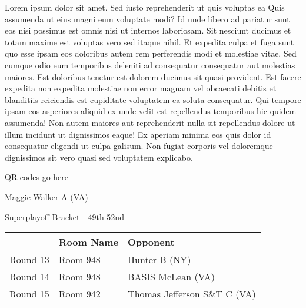 \documentclass{article}%
\begin{document}
\vspace*{8pt}%
\linebreak%
\newline%
\newline%
Lorem ipsum dolor sit amet. Sed iusto reprehenderit ut quis voluptas ea Quis assumenda ut eius magni eum voluptate modi? Id unde libero ad pariatur sunt eos nisi possimus est omnis nisi ut internos laboriosam. Sit nesciunt ducimus et totam maxime est voluptas vero sed itaque nihil. Et expedita culpa et fuga sunt quo esse ipsam eos doloribus autem rem perferendis modi et molestiae vitae.\newline%
\newline%
Sed cumque odio eum temporibus deleniti ad consequatur consequatur aut molestias maiores. Est doloribus tenetur est dolorem ducimus sit quasi provident. Est facere expedita non expedita molestiae non error magnam vel obcaecati debitis et blanditiis reiciendis est cupiditate voluptatem ea soluta consequatur. Qui tempore ipsam eos asperiores aliquid ex unde velit est repellendus temporibus hic quidem assumenda!\newline%
\newline%
Non autem maiores aut reprehenderit nulla sit repellendus dolore ut illum incidunt ut dignissimos eaque! Ex aperiam minima eos quis dolor id consequatur eligendi ut culpa galisum. Non fugiat corporis vel doloremque dignissimos sit vero quasi sed voluptatem explicabo.\newline%
\newline%
%
\vspace*{30pt}%
\begin{center}%
\begin{Huge}%
QR codes go here%
\end{Huge}%
\end{center}%
\newpage%
\begin{center}%
\begin{Huge}%
Maggie Walker A (VA)%
\end{Huge}%
\vspace*{8pt}%
\linebreak%
\begin{Large}%
Superplayoff Bracket {-} 49th{-}52nd%
\end{Large}%
\end{center}%
%
\begin{tabularx}{\textwidth}{|c|Y|Y|}%
\hline%
&Room Name&Opponent\\%
\hline%
Round 13&Room 948&Hunter B (NY)\\%
Round 14&Room 948&BASIS McLean (VA)\\%
Round 15&Room 942&Thomas Jefferson S\&T C (VA)\\%
\hline%
\end{tabularx}%
\end{document}
